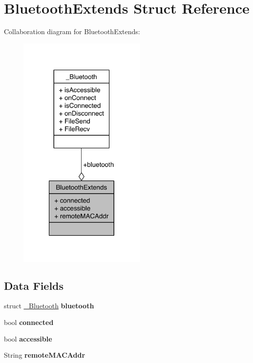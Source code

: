 \hypertarget{structBluetoothExtends}{\section{Bluetooth\-Extends Struct Reference}
\label{structBluetoothExtends}
}


Collaboration diagram for Bluetooth\-Extends\-:\nopagebreak
\begin{figure}[H]
\begin{center}
\leavevmode
\includegraphics[width=179pt]{dc/dd9/structBluetoothExtends__coll__graph}
\end{center}
\end{figure}
\subsection*{Data Fields}
\begin{DoxyCompactItemize}
\item 
\hypertarget{structBluetoothExtends_afe4e56b7ac932d03957e2c38f209f55c}{struct \hyperlink{struct__Bluetooth}{\-\_\-\-Bluetooth} {\bfseries bluetooth}}\label{structBluetoothExtends_afe4e56b7ac932d03957e2c38f209f55c}

\item 
\hypertarget{structBluetoothExtends_ab36823025f12a809217f7771125658c2}{bool {\bfseries connected}}\label{structBluetoothExtends_ab36823025f12a809217f7771125658c2}

\item 
\hypertarget{structBluetoothExtends_a348a5a495aba2753e3e5e5d013f1c612}{bool {\bfseries accessible}}\label{structBluetoothExtends_a348a5a495aba2753e3e5e5d013f1c612}

\item 
\hypertarget{structBluetoothExtends_a473f43fc5e8e19c1221c16e6fac3cb63}{String {\bfseries remote\-M\-A\-C\-Addr}}\label{structBluetoothExtends_a473f43fc5e8e19c1221c16e6fac3cb63}

\end{DoxyCompactItemize}


